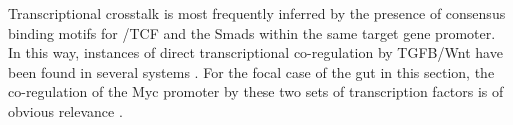 Transcriptional crosstalk is most frequently inferred by the presence
of consensus binding motifs for \bcat/TCF and the Smads within the
same target gene promoter. In this way, 
instances of direct transcriptional co-regulation by TGFB/Wnt
have been found in several systems 
\cite{Hussein2003,Zhou2012,Labbe2000,Rodriguez-Carballo2011}.
For the focal case of the gut in this section, the
co-regulation of the Myc promoter by these two sets of transcription factors
is of obvious relevance \cite{Hu2005} .

